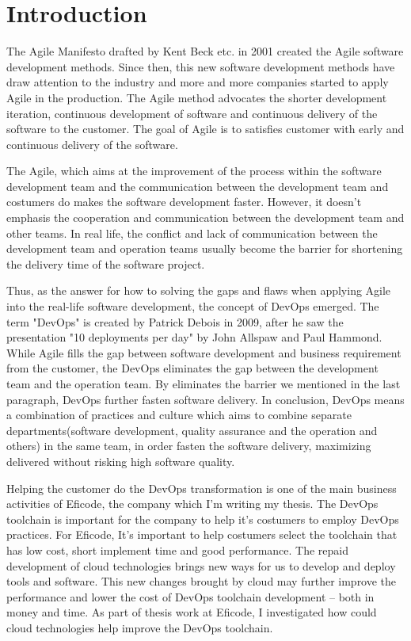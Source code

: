 \chapter{Introduction}
\label{chp:introduction}
The Agile Manifesto drafted by Kent Beck etc. in 2001 created the Agile software development methods\cite{beck2001manifesto}. Since then, this new software development methods have draw attention to the industry and more and more companies started to apply Agile in the production.
The Agile method advocates the shorter development iteration, continuous development of software and continuous delivery of the software to the customer. The goal of Agile is to satisfies customer with early and continuous delivery of the software.\cite{beck2001manifesto} 
\par
The Agile, which aims at the improvement of the process within the software development team and the communication between the development team and costumers \cite{miglierina2014application} do makes the software development faster. However, it doesn't emphasis the cooperation and communication between the development team and other teams. In real life, the conflict and lack of communication between the development team and operation teams usually become the barrier for shortening the delivery time of the software project.
\par
Thus, as the answer for how to solving the gaps and flaws when applying Agile into the real-life software development, the concept of DevOps emerged. The term "DevOps" is created by Patrick Debois in 2009, after he saw the presentation "10 deployments per day" by John Allspaw and Paul Hammond.\cite{kim2016devops} While Agile fills the gap between software development and business requirement from the customer, the DevOps eliminates the gap between the development team and the operation team. \cite{WhatisaD20:online} By eliminates the barrier we mentioned in the last paragraph, DevOps further fasten software delivery. In conclusion,
DevOps means a combination of practices and culture which aims to combine separate departments(software development, quality assurance and the operation and others) in the same team, in order fasten the software delivery, maximizing delivered without risking high software quality. \cite{DevOpsWi87:online}\cite{ebert2016devops} 
\par
Helping the customer do the DevOps transformation is one of the main business activities of Eficode, the company which I'm writing my thesis. The DevOps toolchain is important for the company to help it's costumers to employ DevOps practices. For Eficode, It's important to help costumers select the toolchain that has low cost, short implement time and good performance. 
The repaid development of cloud technologies brings new ways for us to develop and deploy tools and software. This new changes brought by cloud may further improve the performance and lower the cost of DevOps toolchain development -- both in money and time. As part of thesis work at Eficode, I investigated how could cloud technologies help improve the DevOps toolchain. 
